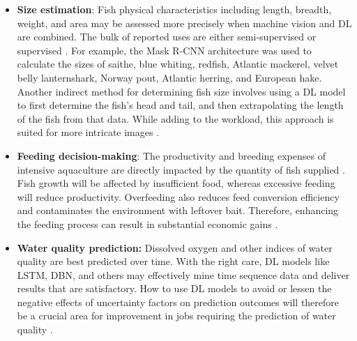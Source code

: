 \begin{itemize}
    \item \textbf{Size estimation}: Fish physical characteristics including length, breadth, weight, and area may be assessed more precisely when machine vision and DL are combined. The bulk of reported uses are either semi-supervised or supervised \cite{marini2018tracking}. For example, the Mask R-CNN architecture was used to calculate the sizes of saithe, blue whiting, redfish, Atlantic mackerel, velvet belly lanternshark, Norway pout, Atlantic herring, and European hake. Another indirect method for determining fish size involves using a DL model to first determine the fish's head and tail, and then extrapolating the length of the fish from that data. While adding to the workload, this approach is suited for more intricate images \cite{tseng2020automatic}.
    \item \textbf{Feeding decision-making}: The productivity and breeding expenses of intensive aquaculture are directly impacted by the quantity of fish supplied \cite{chen2020feed}. Fish growth will be affected by insufficient food, whereas excessive feeding will reduce productivity. Overfeeding also reduces feed conversion efficiency and contaminates the environment with leftover bait. Therefore, enhancing the feeding process can result in substantial economic gains \cite{zhou2018intelligent}.
    \item \textbf{Water quality prediction:} Dissolved oxygen and other indices of water quality are best predicted over time. With the right care, DL models like LSTM, DBN, and others may effectively mine time sequence data and deliver results that are satisfactory. How to use DL models to avoid or lessen the negative effects of uncertainty factors on prediction outcomes will therefore be a crucial area for improvement in jobs requiring the prediction of water quality \cite{yang2021deep}.
\end{itemize}

